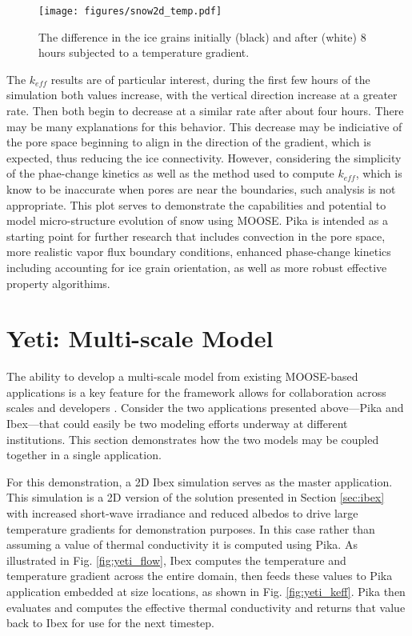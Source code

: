 \begin{figure}[!ht]
  \texttt{[image: figures/snow2d\_temp.pdf]}
  \caption{The difference in the ice grains initially (black) and after (white) 8 hours subjected to a  temperature gradient.}
  \label{fig:snow2d:grains}
\end{figure}

The $k_{eff}$ results are of particular interest, during the first few hours of the simulation both values increase, with the vertical direction increase at a greater rate. Then both begin to decrease at a similar rate after about four hours. There may be many explanations for this behavior. This decrease may be indiciative of the pore space beginning to align in the direction of the gradient, which is expected, thus reducing the ice connectivity. However, considering the simplicity of the phae-change kinetics as well as the method used to compute $k_{eff}$, which is know to be inaccurate when pores are near the boundaries, such analysis is not appropriate. This plot serves to demonstrate the capabilities and potential to model micro-structure evolution of snow using MOOSE. Pika is intended as a starting point for further research that includes convection in the pore space, more realistic vapor flux boundary conditions, enhanced phase-change kinetics including accounting for ice grain orientation, as well as more robust effective property algorithims.


\section{Yeti: Multi-scale Model}\label{sec:yeti}
The ability to develop a multi-scale model from existing MOOSE-based applications is a key feature for the framework allows for collaboration across scales and developers \citet{gaston2014physics}. Consider the two applications presented above---Pika and Ibex---that could easily be two modeling efforts underway at different institutions. This section demonstrates how the two models may be coupled together in a single application.

For this demonstration, a 2D Ibex simulation serves as the master application. This simulation is a 2D version of the solution presented in Section \ref{sec:ibex} with increased short-wave irradiance and reduced albedos to drive large temperature gradients for demonstration purposes. In this case rather than assuming a value of thermal conductivity it is computed using Pika. As illustrated in Fig. \ref{fig:yeti_flow}, Ibex computes the temperature and temperature gradient across the entire domain, then feeds these values to Pika application embedded at size locations, as shown in Fig. \ref{fig:yeti_keff}. Pika then evaluates and computes the effective thermal conductivity and returns that value back to Ibex for use for the next timestep.

